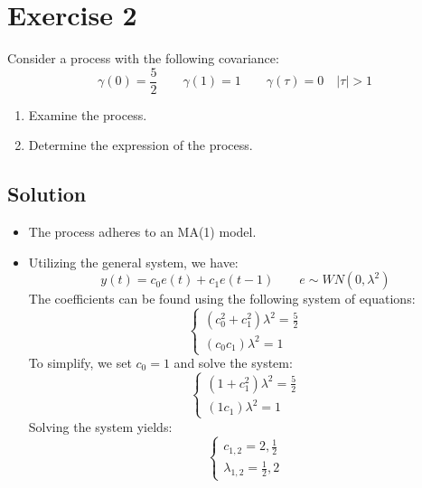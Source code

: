 \section{Exercise 2}

Consider a process with the following covariance:
\[\gamma(0)=\dfrac{5}{2}\qquad\gamma(1)=1\qquad\gamma(\tau)=0 \quad \left\lvert \tau \right\rvert > 1\]
\begin{enumerate}
    \item Examine the process.
    \item Determine the expression of the process.
\end{enumerate}

\subsection*{Solution}
\begin{itemize}
    \item The process adheres to an MA(1) model.
    \item Utilizing the general system, we have:
        \[y(t)=c_0e(t)+c_1e(t-1)\qquad e\sim WN(0,\lambda^2)\]
        The coefficients can be found using the following system of equations:
        \[\begin{cases}
            \left(c_0^2+c_1^2\right)\lambda^2 = \frac{5}{2} \\
            \left(c_0c_1\right)\lambda^2= 1
        \end{cases}\]
        To simplify, we set $c_0=1$ and solve the system:
        \[\begin{cases}
            \left(1+c_1^2\right)\lambda^2 = \frac{5}{2} \\
            \left(1c_1\right)\lambda^2= 1
        \end{cases}\]
        Solving the system yields:
        \[\begin{cases}
            c_{1,2} = 2, \frac{1}{2} \\
            \lambda_{1,2} = \frac{1}{2}, 2
        \end{cases}\]
\end{itemize}
